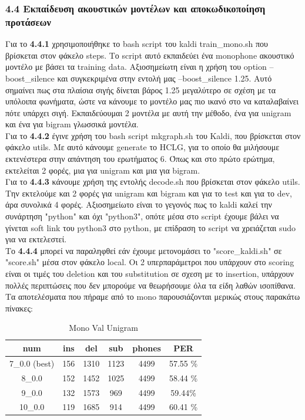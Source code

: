 \documentclass{article}
\begin{document}
\subsubsection*{4.4 Εκπαίδευση ακουστικών μοντέλων και αποκωδικοποίηση προτάσεων}
Για το \textbf{4.4.1} χρησιμοποιήθηκε το bash script του kaldi train\_mono.sh που βρίσκεται στον φάκελο steps. Το script αυτό εκπαιδεύει ένα monophone ακουστικό μοντέλο με βάσει τα training data. Αξιοσημείωτη είναι η χρήση του option --boost\_silence και συγκεκριμένα στην εντολή μας --boost\_silence 1.25. Αυτό σημαίνει πως στα πλαίσια σιγής δίνεται βάρος 1.25 μεγαλύτερο σε σχέση με τα υπόλοιπα φωνήματα, ώστε να κάνουμε το μοντέλο μας πιο ικανό στο να καταλαβαίνει πότε υπάρχει σιγή. Εκπαιδεύουμαι 2 μοντέλα με αυτή την μέθοδο, ένα για unigram και ένα για bigram γλωσσικά μοντέλα.
%
%
\\[8mm]
%
%
Για το \textbf{4.4.2} έγινε χρήση του bash script mkgraph.sh του Kaldi, που βρίσκεται στον φάκελο utils. Με αυτό κάνουμε generate το HCLG, για το οποίο θα μιλήσουμε εκτενέστερα στην απάντηση του ερωτήματος 6. Όπως και στο πρώτο ερώτημα, εκτελείται 2 φορές, μια για unigram και μια για bigram.
%
%
\\[8mm]
%
%
Για το \textbf{4.4.3} κάνουμε χρήση της εντολής decode.sh που βρίσκεται στον φάκελο utils. Την εκτελούμε και 2 φορές για unigram και bigram και για το test και για το dev, άρα συνολικά 4 φορές. Αξιοσημείωτο είναι το γεγονός πως το kaldi καλεί την συνάρτηση "python" και όχι "python3", οπότε μέσα στο script έχουμε βάλει να γίνεται soft link του python3 στο python, με επίδραση το script να χρειάζεται sudo για να εκτελεστεί.
%
\\[8mm]
Το \textbf{4.4.4} μπορεί να παραληφθεί εάν έχουμε μετονομάσει το "score\_kaldi.sh" σε "score.sh" μέσα στον φάκελο local. Οι 2 υπερπαράμετροι που υπάρχουν στο scoring είναι οι τιμές του deletion και του substitution σε σχεση με το insertion, υπάρχουν πολλές περιπτώσεις που δεν μπορούμε να θεωρήσουμε όλα τα είδη λαθών ισοπίθανα. Τα αποτελέσματα που πήραμε από το mono παρουσιάζονται μερικώς στους παρακάτω πίνακες:
%
%
%
\begin{table}[h!]
\caption{Mono Val Unigram}
\centering
\begin{tabular}{|c | c | c | c | c| c |}
\hline
num &  ins & del & sub & phones & PER\\
\hline
\rowcolor{green!20}  7\_0.0 (best) & 156 & 1310 & 1123 & 4499 & 57.55 \% \\
8\_0.0 & 152 & 1452 & 1025 & 4499 & 58.44 \% \\ %
9\_0.0 & 132 & 1573 &969 & 4499 &  59.44\% \\ %
10\_0.0 & 119 & 1685 & 914 & 4499 & 60.41 \% \\ %
\hline
\end{tabular}
\end{table}
\end{document}
